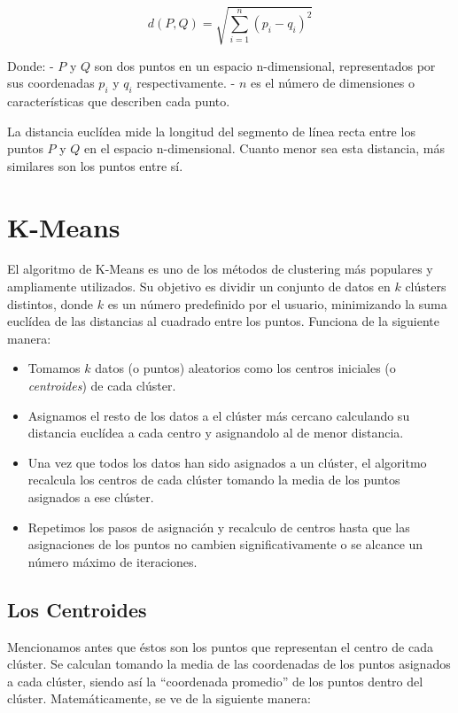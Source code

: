 \documentclass[
  spanish,
  letterpaper,
  DIV=11,
  numbers=noendperiod]{scrreprt}
\providecommand{\tightlist}{%
  \setlength{\itemsep}{0pt}\setlength{\parskip}{0pt}}
\begin{document}
\[d(P, Q) = \sqrt{\sum_{i=1}^{n} (p_i - q_i)^2}\]

Donde: - \(P\) y \(Q\) son dos puntos en un espacio n-dimensional,
representados por sus coordenadas \(p_i\) y \(q_i\) respectivamente. -
\(n\) es el número de dimensiones o características que describen cada
punto.

La distancia euclídea mide la longitud del segmento de línea recta entre
los puntos \(P\) y \(Q\) en el espacio n-dimensional. Cuanto menor sea
esta distancia, más similares son los puntos entre sí.

\section{K-Means}\label{k-means}

El algoritmo de K-Means es uno de los métodos de clustering más
populares y ampliamente utilizados. Su objetivo es dividir un conjunto
de datos en \(k\) clústers distintos, donde \(k\) es un número
predefinido por el usuario, minimizando la suma euclídea de las
distancias al cuadrado entre los puntos. Funciona de la siguiente
manera:

\begin{itemize}
\tightlist
\item
  Tomamos \(k\) datos (o puntos) aleatorios como los centros iniciales
  (o \emph{centroides}) de cada clúster.
\item
  Asignamos el resto de los datos a el clúster más cercano calculando su
  distancia euclídea a cada centro y asignandolo al de menor distancia.
\item
  Una vez que todos los datos han sido asignados a un clúster, el
  algoritmo recalcula los centros de cada clúster tomando la media de
  los puntos asignados a ese clúster.
\item
  Repetimos los pasos de asignación y recalculo de centros hasta que las
  asignaciones de los puntos no cambien significativamente o se alcance
  un número máximo de iteraciones.
\end{itemize}

\subsection{Los Centroides}\label{los-centroides}

Mencionamos antes que éstos son los puntos que representan el centro de
cada clúster. Se calculan tomando la media de las coordenadas de los
puntos asignados a cada clúster, siendo así la ``coordenada promedio''
de los puntos dentro del clúster. Matemáticamente, se ve de la siguiente
manera:
\end{document}
